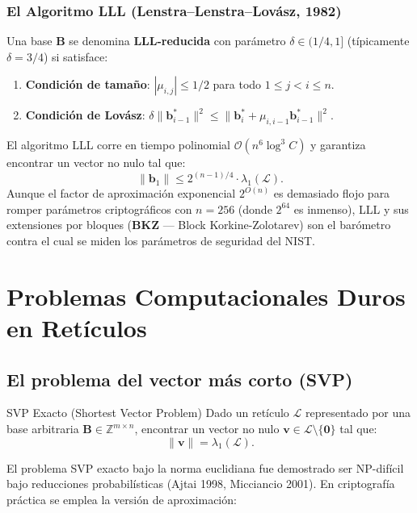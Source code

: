 \documentclass[11pt,a4paper,twoside,openright]{book}
\theoremstyle{plain}
\theoremstyle{definition}
\theoremstyle{remark}
\newcommand{\Z}{\mathbb{Z}}
\newcommand{\vv}[1]{\mathbf{#1}}
\newcommand{\mm}[1]{\mathbf{#1}}
\begin{document}
\subsection{El Algoritmo LLL (Lenstra--Lenstra--Lov\'asz, 1982)}

Una base $\mm{B}$ se denomina \textbf{LLL-reducida} con par\'ametro $\delta \in (1/4, 1]$ (t\'ipicamente $\delta = 3/4$) si satisface:
\begin{enumerate}
  \item \textbf{Condici\'on de tama\~no}: $|\mu_{i,j}| \leq 1/2$ para todo $1 \leq j < i \leq n$.
  \item \textbf{Condici\'on de Lov\'asz}: $\delta \|\vv{b}_{i-1}^*\|^2 \leq \|\vv{b}_i^* + \mu_{i, i-1}\vv{b}_{i-1}^*\|^2$.
\end{enumerate}

El algoritmo LLL corre en tiempo polinomial $\mathcal{O}(n^6 \log^3 C)$ y garantiza encontrar un vector no nulo tal que:
\[
  \|\vv{b}_1\| \leq 2^{(n-1)/4} \cdot \lambda_1(\mathcal{L}).
\]
Aunque el factor de aproximaci\'on exponencial $2^{O(n)}$ es demasiado flojo para romper par\'ametros criptogr\'aficos con $n=256$ (donde $2^{64}$ es inmenso), LLL y sus extensiones por bloques (\textbf{BKZ} --- Block Korkine-Zolotarev) son el bar\'ometro contra el cual se miden los par\'ametros de seguridad del NIST.

\chapter{Problemas Computacionales Duros en Ret\'iculos}
\label{chap:problemas_duros}

\section{El problema del vector m\'as corto (SVP)}

\begin{midef}{SVP Exacto (Shortest Vector Problem)}
Dado un ret\'iculo $\mathcal{L}$ representado por una base arbitraria $\mm{B} \in \Z^{m \times n}$, encontrar un vector no nulo $\vv{v} \in \mathcal{L} \setminus \{\vv{0}\}$ tal que:
\[
  \|\vv{v}\| = \lambda_1(\mathcal{L}).
\]
\end{midef}

El problema SVP exacto bajo la norma euclidiana fue demostrado ser NP-dif\'icil bajo reducciones probabil\'isticas (Ajtai 1998, Micciancio 2001). En criptograf\'ia pr\'actica se emplea la versi\'on de aproximaci\'on:
\end{document}
